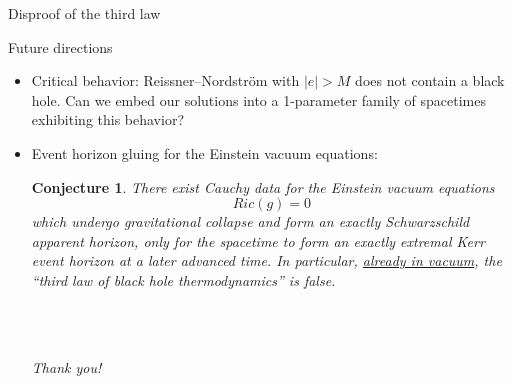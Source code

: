\documentclass[compress,usenames,dvipsnames,8pt]{beamer}
\newtheorem*{conjecture}{Conjecture}
\theoremstyle{definition}
\renewcommand{\(}{\begin{columns}}
\renewcommand{\)}{\end{columns}}
\newcommand{\<}[1]{\begin{column}{#1}}
\renewcommand{\>}{\end{column}}
\begin{document}
\begin{frame}{Disproof of the third law}
\begin{figure}
 \def\svgwidth{24pc}

\end{figure}
\end{frame}

\begin{frame}{Future directions}

\begin{itemize}
\item Critical behavior: Reissner--Nordstr\"om with $|e|>M$ does not contain a black hole. \pause Can we embed our solutions into a 1-parameter family of spacetimes exhibiting this behavior? \pause

\item Event horizon gluing for the Einstein vacuum equations: 

\begin{conjecture}
There exist Cauchy data for the  Einstein vacuum equations
\begin{equation*}
    Ric(g) =0
\end{equation*}
which undergo gravitational collapse and form an exactly Schwarzschild apparent horizon, only for the spacetime to form an exactly extremal Kerr event horizon at a later advanced time. 
In particular,  \underline{already in vacuum},    the ``third law of black hole thermodynamics'' is false.
\end{conjecture}

~\\ 

~\\ 

\pause

\begin{center}
\emph{Thank you!}
\end{center}

\end{itemize}

\end{frame}
\end{document}
